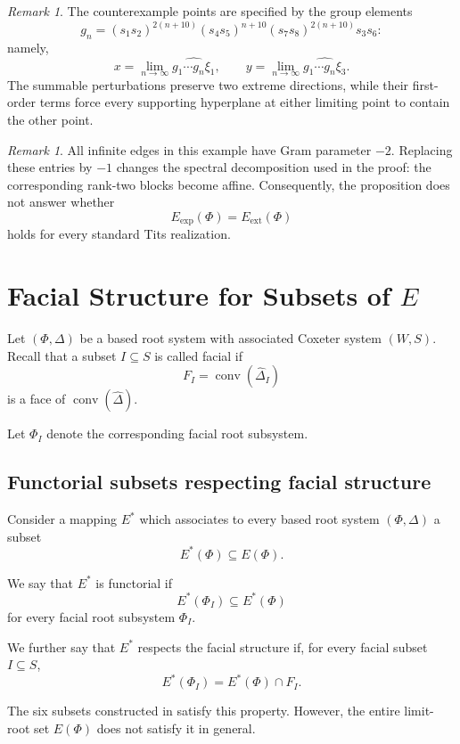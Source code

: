 \documentclass[11pt,reqno]{amsart}
\theoremstyle{plain}
\theoremstyle{definition}
\theoremstyle{remark}
\newtheorem{remark}[theorem]{Remark}
\numberwithin{equation}{section}
\begin{document}
\begin{remark}
The counterexample points are specified by the group elements
\[
g_n=
(s_1s_2)^{2(n+10)}
(s_4s_5)^{n+10}
(s_7s_8)^{2(n+10)}
s_3s_6:
\]
namely,
\[
x=\lim_{n\to\infty}
\widehat{g_1\cdots g_n\xi_1},
\qquad
y=\lim_{n\to\infty}
\widehat{g_1\cdots g_n\xi_3}.
\]
The summable perturbations preserve two extreme directions,
while their first-order terms force every supporting hyperplane
at either limiting point to contain the other point.
\end{remark}

\begin{remark}
All infinite edges in this example have Gram parameter $-2$.
Replacing these entries by $-1$ changes the spectral
decomposition used in the proof: the corresponding rank-two
blocks become affine.
Consequently, the proposition does not answer whether
\[
E_{\mathrm{exp}}(\Phi)=E_{\mathrm{ext}}(\Phi)
\]
holds for every standard Tits realization.
\end{remark}
\section{Facial Structure for Subsets of \texorpdfstring{$E$}{E}}

Let $(\Phi,\Delta)$ be a based root system with associated
Coxeter system $(W,S)$.
Recall that a subset $I\subseteq S$ is called facial if
\[
F_I=\operatorname{conv}(\widehat{\Delta}_I)
\]
is a face of $\operatorname{conv}(\widehat{\Delta})$.

Let $\Phi_I$ denote the corresponding facial root subsystem.

\subsection{Functorial subsets respecting facial structure}

Consider a mapping $E^*$ which associates to every based
root system $(\Phi,\Delta)$ a subset
\[
E^*(\Phi)\subseteq E(\Phi).
\]

We say that $E^*$ is functorial if
\[
E^*(\Phi_I)\subseteq E^*(\Phi)
\]
for every facial root subsystem $\Phi_I$.

We further say that $E^*$ respects the facial structure
if, for every facial subset $I\subseteq S$,
\begin{equation}\label{eq:facial-restriction}
E^*(\Phi_I)=E^*(\Phi)\cap F_I.
\end{equation}

The six subsets constructed in \cite[Section~5]{DHR} satisfy this
property. However, the entire limit-root set $E(\Phi)$
does not satisfy it in general.
\end{document}
